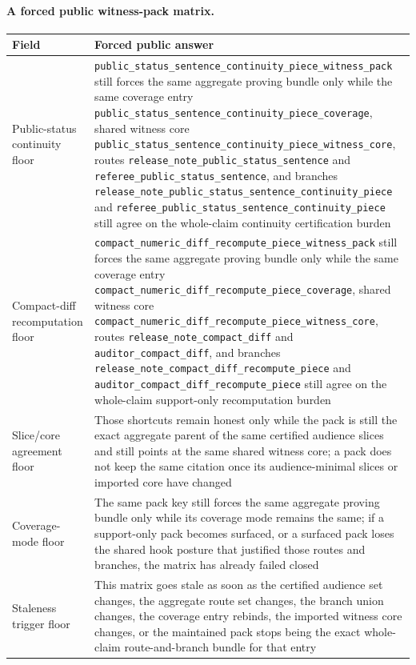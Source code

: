 \documentclass[11pt]{article}
\begin{document}
\paragraph{A forced public witness-pack matrix.}
\begin{table}[t]
\centering
\small
\begin{tabularx}{\linewidth}{@{}lX@{}}
\toprule
Field & Forced public answer \\
\midrule
Public-status continuity floor & \nolinkurl{public_status_sentence_continuity_piece_witness_pack} still forces the same aggregate proving bundle only while the same coverage entry \nolinkurl{public_status_sentence_continuity_piece_coverage}, shared witness core \nolinkurl{public_status_sentence_continuity_piece_witness_core}, routes \nolinkurl{release_note_public_status_sentence} and \nolinkurl{referee_public_status_sentence}, and branches \nolinkurl{release_note_public_status_sentence_continuity_piece} and \nolinkurl{referee_public_status_sentence_continuity_piece} still agree on the whole-claim continuity certification burden \\
Compact-diff recomputation floor & \nolinkurl{compact_numeric_diff_recompute_piece_witness_pack} still forces the same aggregate proving bundle only while the same coverage entry \nolinkurl{compact_numeric_diff_recompute_piece_coverage}, shared witness core \nolinkurl{compact_numeric_diff_recompute_piece_witness_core}, routes \nolinkurl{release_note_compact_diff} and \nolinkurl{auditor_compact_diff}, and branches \nolinkurl{release_note_compact_diff_recompute_piece} and \nolinkurl{auditor_compact_diff_recompute_piece} still agree on the whole-claim support-only recomputation burden \\
Slice/core agreement floor & Those shortcuts remain honest only while the pack is still the exact aggregate parent of the same certified audience slices and still points at the same shared witness core; a pack does not keep the same citation once its audience-minimal slices or imported core have changed \\
Coverage-mode floor & The same pack key still forces the same aggregate proving bundle only while its coverage mode remains the same; if a support-only pack becomes surfaced, or a surfaced pack loses the shared hook posture that justified those routes and branches, the matrix has already failed closed \\
Staleness trigger floor & This matrix goes stale as soon as the certified audience set changes, the aggregate route set changes, the branch union changes, the coverage entry rebinds, the imported witness core changes, or the maintained pack stops being the exact whole-claim route-and-branch bundle for that entry \\

\end{tabularx}
\end{table}
\end{document}
